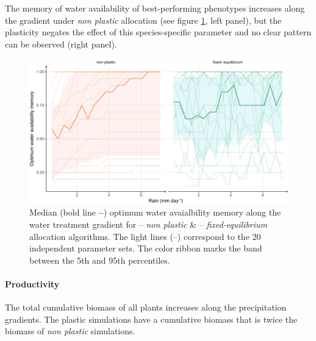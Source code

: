 The memory of water availability of best-performing phenotypes increases along the gradient under \textit{non plastic} allocation (see figure \ref{fig:gradient_w_ini_trend}, left panel), but the plasticity negates the effect of this species-specific parameter and no clear pattern can be observed (right panel).


\begin{figure}
\includegraphics[width = \textwidth]{./2_PP/Figures/Rain/best_w_ini_pl_rain_grad_alt.pdf}
\caption{Median (bold line \textbf{--}) optimum water avaialbility memory along the water treatment gradient for \textcolor{myOrange}{-- \textit{non plastic}} \&  \textcolor{myGreen}{-- \textit{fixed-equilibrium}} allocation algorithms. The light lines (--) correspond to the 20 independent parameter sets. The color ribbon marks the band between the 5th and 95th percentiles.} \label{fig:gradient_w_ini_trend}%
\end{figure}


\paragraph{Productivity}

The total cumulative biomass of all plants increases along the precipitation gradients. The plastic simulations have a cumulative biomass that is twice the biomass of \textit{non plastic} simulations.


